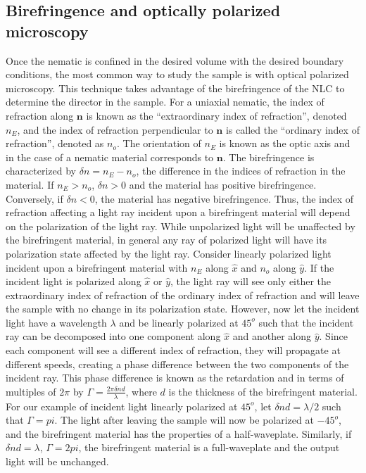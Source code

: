 \subsection{Birefringence and optically polarized microscopy}
Once the nematic is confined in the desired volume with the desired boundary conditions, the most common way to study the sample is with optical polarized microscopy.
This technique takes advantage of the birefringence of the NLC to determine the director in the sample.
For a uniaxial nematic, the index of refraction along $\mathbf{n}$ is known as the ``extraordinary index of refraction'', denoted $n_E$, and the index of refraction perpendicular to $\mathbf{n}$ is called the ``ordinary index of refraction'', denoted as $n_o$.
The orientation of $n_E$ is known as the optic axis and in the case of a nematic material corresponds to $\mathbf{n}$.
The birefringence is characterized by $\delta n = n_E-n_o$, the difference in the indices of refraction in the material.
If $n_E > n_o$, $\delta n > 0$ and the material has positive birefringence.
Conversely, if $\delta n < 0$, the material has negative birefringence.
Thus, the index of refraction affecting a light ray incident upon a birefringent material will depend on the polarization of the light ray.
While unpolarized light will be unaffected by the birefringent material, in general any ray of polarized light will have its polarization state affected by the light ray.
Consider linearly polarized light incident upon a birefringent material with $n_E$ along $\hat{x}$ and $n_o$ along $\hat{y}$.
If the incident light is polarized along $\hat{x}$ or $\hat{y}$, the light ray will see only either the extraordinary index of refraction of the ordinary index of refraction and will leave the sample with no change in its polarization state.
However, now let the incident light have a wavelength $\lambda$ and be linearly polarized at $45^o$ such that the incident ray can be decomposed into one component along $\hat{x}$ and another along $\hat{y}$.
Since each component will see a different index of refraction, they will propagate at different speeds, creating a phase difference between the two components of the incident ray.
This phase difference is known as the retardation and in terms of multiples of $2 \pi$ by $\Gamma = \frac{2 \pi \delta n d}{\lambda}$, where $d$ is the thickness of the birefringent material.
For our example of incident light linearly polarized at $45^o$, let $\delta n d = \lambda / 2$ such that $\Gamma =  pi$.
The light after leaving the sample will now be polarized at $-45^o$, and the birefringent material has the properties of a half-waveplate.
Similarly, if $\delta n d = \lambda$, $\Gamma =  2 pi$, the birefringent material is a full-waveplate and the output light will be unchanged.\\

